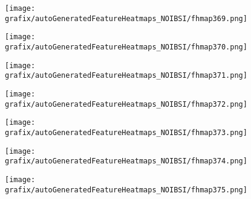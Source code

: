 \begin{subfigure}{\wid\textwidth} 
    \centering 
    \caption{\tiny \sffamily {}} 
    \vspace{\vsp} 
    \texttt{[image: grafix/autoGeneratedFeatureHeatmaps\_NOIBSI/fhmap369.png]} 
\end{subfigure} 
\hspace{\hsp} 
\begin{subfigure}{\wid\textwidth} 
    \centering 
    \caption{\tiny \sffamily {}} 
    \vspace{\vsp} 
    \texttt{[image: grafix/autoGeneratedFeatureHeatmaps\_NOIBSI/fhmap370.png]} 
\end{subfigure} 
\hspace{\hsp} 
\begin{subfigure}{\wid\textwidth} 
    \centering 
    \caption{\tiny \sffamily {}} 
    \vspace{\vsp} 
    \texttt{[image: grafix/autoGeneratedFeatureHeatmaps\_NOIBSI/fhmap371.png]} 
\end{subfigure} 
\hspace{\hsp} 
\begin{subfigure}{\wid\textwidth} 
    \centering 
    \caption{\tiny \sffamily {}} 
    \vspace{\vsp} 
    \texttt{[image: grafix/autoGeneratedFeatureHeatmaps\_NOIBSI/fhmap372.png]} 
\end{subfigure} 
\hspace{\hsp} 
\begin{subfigure}{\wid\textwidth} 
    \centering 
    \caption{\tiny \sffamily {}} 
    \vspace{\vsp} 
    \texttt{[image: grafix/autoGeneratedFeatureHeatmaps\_NOIBSI/fhmap373.png]} 
\end{subfigure} 
\hspace{\hsp} 
\begin{subfigure}{\wid\textwidth} 
    \centering 
    \caption{\tiny \sffamily {}} 
    \vspace{\vsp} 
    \texttt{[image: grafix/autoGeneratedFeatureHeatmaps\_NOIBSI/fhmap374.png]} 
\end{subfigure} 
\hspace{\hsp} 
\begin{subfigure}{\wid\textwidth} 
    \centering 
    \caption{\tiny \sffamily {}} 
    \vspace{\vsp} 
    \texttt{[image: grafix/autoGeneratedFeatureHeatmaps\_NOIBSI/fhmap375.png]} 
\end{subfigure} 
